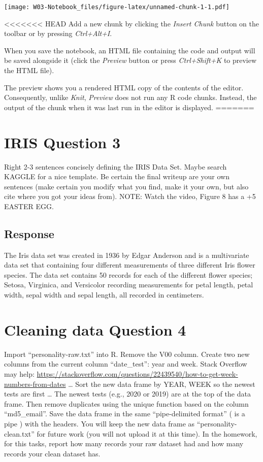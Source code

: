 \documentclass[
]{article}
\newenvironment{Shaded}{\begin{snugshade}}{\end{snugshade}}
\begin{document}
\begin{Shaded}
\begin{Highlighting}[]
\texttt{[image: W03-Notebook\_files/figure-latex/unnamed-chunk-1-1.pdf]}

<<<<<<< HEAD
Add a new chunk by clicking the \emph{Insert Chunk} button on the
toolbar or by pressing \emph{Ctrl+Alt+I}.

When you save the notebook, an HTML file containing the code and output
will be saved alongside it (click the \emph{Preview} button or press
\emph{Ctrl+Shift+K} to preview the HTML file).

The preview shows you a rendered HTML copy of the contents of the
editor. Consequently, unlike \emph{Knit}, \emph{Preview} does not run
any R code chunks. Instead, the output of the chunk when it was last run
in the editor is displayed.
=======
\hypertarget{iris-question-3}{%
\section{IRIS Question 3}\label{iris-question-3}}

Right 2-3 sentences concisely defining the IRIS Data Set. Maybe search
KAGGLE for a nice template. Be certain the final writeup are your own
sentences (make certain you modify what you find, make it your own, but
also cite where you got your ideas from). NOTE: Watch the video, Figure
8 has a +5 EASTER EGG.

\hypertarget{response}{%
\subsection{Response}\label{response}}

The Iris data set was created in 1936 by Edgar Anderson and is a
multivariate data set that containing four different measurements of
three different Iris flower species. The data set contains 50 records
for each of the different flower species; Setosa, Virginica, and
Versicolor recording measurements for petal length, petal width, sepal
width and sepal length, all recorded in centimeters.

\hypertarget{cleaning-data-question-4}{%
\section{Cleaning data Question 4}\label{cleaning-data-question-4}}

Import ``personality-raw.txt'' into R. Remove the V00 column. Create two
new columns from the current column ``date\_test'': year and week. Stack
Overflow may help:
\url{https://stackoverflow.com/questions/22439540/how-to-get-week-numbers-from-dates}
\ldots{} Sort the new data frame by YEAR, WEEK so the newest tests are
first \ldots{} The newest tests (e.g., 2020 or 2019) are at the top of
the data frame. Then remove duplicates using the unique function based
on the column ``md5\_email''. Save the data frame in the same
``pipe-delimited format'' ( \textbar{} is a pipe ) with the headers. You
will keep the new data frame as ``personality-clean.txt'' for future
work (you will not upload it at this time). In the homework, for this
tasks, report how many records your raw dataset had and how many records
your clean dataset has.


\end{Highlighting}
\end{Shaded}
\end{document}
